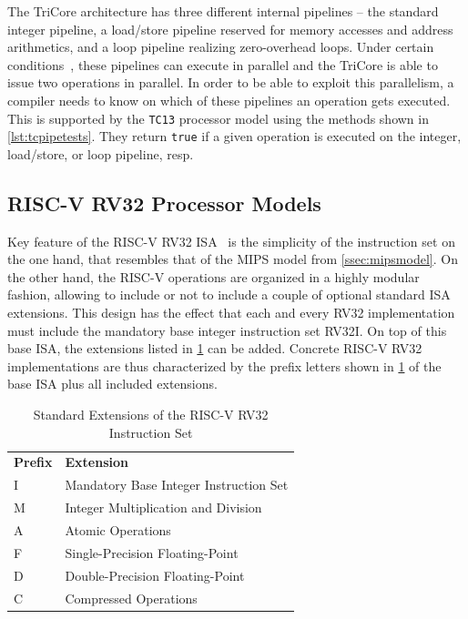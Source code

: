 The TriCore architecture has three different internal pipelines -- the standard integer pipeline, a load/store pipeline reserved for memory accesses and address arithmetics, and a loop pipeline realizing zero-overhead loops.
Under certain conditions~\cite{tricore03}, these pipelines can execute in parallel and the TriCore is able to issue two operations in parallel.
In order to be able to exploit this parallelism, a compiler needs to know on which of these pipelines an operation gets executed.
This is supported by the \texttt{TC13} processor model using the methods shown in \cref{lst:tcpipetests}.
They return \texttt{true} if a given operation is executed on the integer, load/store, or loop pipeline, resp.
\clearpage


\subsection{RISC-V RV32 Processor Models}
\label{ssec:rv32model}

Key feature of the RISC-V RV32 \gls{ISA}~\cite{riscv17} is the simplicity of the instruction set on the one hand, that resembles that of the MIPS model from \cref{ssec:mipsmodel}.
On the other hand, the RISC-V operations are organized in a highly modular fashion, allowing to include or not to include a couple of optional standard \gls{ISA} extensions.
This design has the effect that each and every RV32 implementation must include the mandatory base integer instruction set RV32I.
On top of this base \gls{ISA}, the extensions listed in \cref{tab:rv32isapackets} can be added.
Concrete RISC-V RV32 implementations are thus characterized by the prefix letters shown in \cref{tab:rv32isapackets} of the base \gls{ISA} plus all included extensions.

\begin{table}[h]
  \begin{center}
    \caption{Standard Extensions of the RISC-V RV32 Instruction Set}
    \label{tab:rv32isapackets}
    \begin{tabular}{|l|l|}
      \hline
      \textbf{Prefix} & \textbf{Extension} \\
      \hhline{|=|=|}
      I & Mandatory Base Integer Instruction Set \\
      \hhline{|=|=|}
      M & Integer Multiplication and Division \\
      \hline
      A & Atomic Operations \\
      \hline
      F & Single-Precision Floating-Point \\
      \hline
      D & Double-Precision Floating-Point \\
      \hline
      C & Compressed Operations \\
      \hline
    \end{tabular}
  \end{center}
\end{table}

